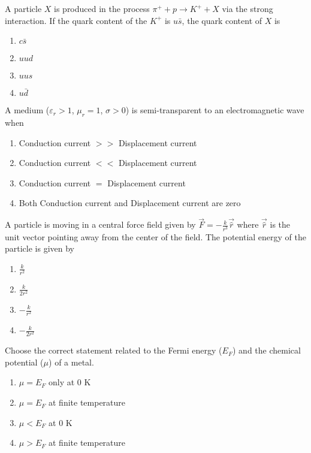 \item A particle $X$ is produced in the process $\pi^{+}+p\rightarrow K^{+}+X$ via the strong interaction. If the quark content of the $K^{+}$ is $u\bar{s}$, the quark content of $X$ is 

\begin{enumerate}
\item $c\bar{s}$
\item $uud$
\item $uus$
\item $u\bar{d}$
\end{enumerate}

\item A medium ($\varepsilon_{r}>1$, $\mu_{r}=1$, $\sigma>0$) is semi-transparent to an electromagnetic wave when

\begin{enumerate}
\item Conduction current $>>$ Displacement current
\item Conduction current $<<$ Displacement current
\item Conduction current $=$ Displacement current
\item Both Conduction current and Displacement current are zero
\end{enumerate}

\item A particle is moving in a central force field given by $\vec{F}=-\frac{k}{r^3}\vec{\hat{r}}$ where $\vec{\hat{r}}$ is the unit vector pointing away from the center of the field. The potential energy of the particle is given by

\begin{enumerate}
\item $\frac{k}{r^2}$
\item $\frac{k}{2r^2}$
\item $-\frac{k}{r^2}$
\item $-\frac{k}{2r^2}$
\end{enumerate}

\item Choose the correct statement related to the Fermi energy ($E_F$) and the chemical potential ($\mu$) of a metal.

\begin{enumerate}
\item $\mu=E_F$ only at $0$ K
\item $\mu=E_F$ at finite temperature
\item $\mu<E_F$ at $0$ K
\item $\mu>E_F$ at finite temperature
\end{enumerate}

